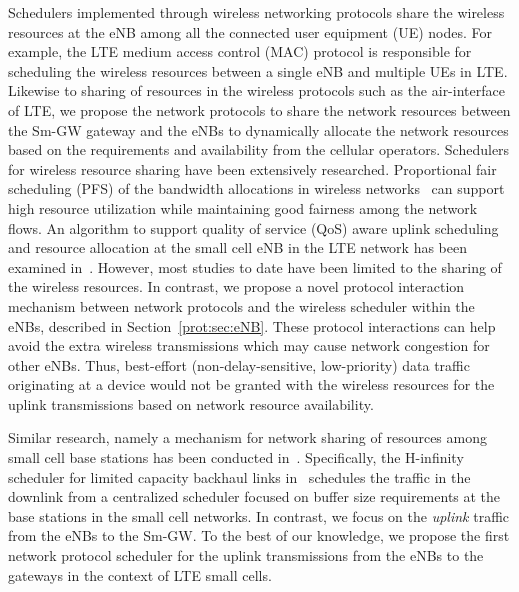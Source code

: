 \documentclass[journal,twoside,comsoc]{IEEEtran}
\makeatletter
\newcommand{\todo}[1]{\textcolor{red}{@TODO: #1}}
\makeatother
\begin{document}
Schedulers implemented through wireless networking protocols
share the wireless resources at the eNB
among all the connected user equipment (UE) nodes.
For example, the LTE medium access control (MAC) protocol \cite{3gppLTEMAC}
is responsible for
scheduling the wireless resources between a single eNB
and multiple UEs in LTE.
Likewise to sharing of resources in the wireless protocols such as 
the air-interface of LTE, we propose the network protocols
to share the network resources between the Sm-GW
gateway and the eNBs to dynamically allocate the
network resources based on the requirements and 
availability from the cellular operators. Schedulers for wireless resource sharing have
been extensively researched.
Proportional fair scheduling (PFS) of
the bandwidth allocations in wireless networks~\cite{Erwu2008} can support
high resource utilization while maintaining good fairness among
the network flows.
An algorithm to support quality of service (QoS) aware uplink scheduling and
resource allocation at the small cell eNB in the LTE network has been
examined in~\cite{Chaudhuri2015}.
However, most studies to date have been
limited to the sharing of the wireless resources.
In contrast, we propose a novel protocol interaction mechanism between
network protocols and the wireless
scheduler within the eNBs, described in Section~\ref{prot:sec:eNB}.
These protocol interactions can help avoid the extra wireless transmissions
which may cause network congestion for other eNBs. Thus, best-effort
(non-delay-sensitive, low-priority) data traffic originating at a device
would not be granted with the wireless resources for the uplink transmissions
based on network resource availability.

Similar research, namely a mechanism for network sharing of resources
among small cell base stations
has been conducted in~\cite{Lakshminarayana2011,lak2013h}.
Specifically, the
H-infinity scheduler for limited capacity
backhaul links in~\cite{Lakshminarayana2011} schedules the traffic
in the downlink from a centralized scheduler
focused on buffer size requirements at
the base stations in the small cell networks.
In contrast,
we focus on the \textit{uplink} traffic from the eNBs to the Sm-GW.
To the best of our knowledge, we propose the first
network protocol scheduler for the uplink transmissions
from the eNBs to the gateways in the context of LTE small cells.
\end{document}
